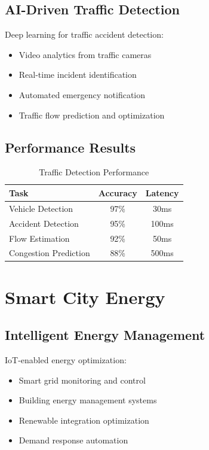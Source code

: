 \documentclass[12pt,a4paper]{article}
\begin{document}
\subsection{AI-Driven Traffic Detection}

Deep learning for traffic accident detection:
\begin{itemize}
    \item Video analytics from traffic cameras
    \item Real-time incident identification
    \item Automated emergency notification
    \item Traffic flow prediction and optimization
\end{itemize}

\subsection{Performance Results}

\begin{table}[H]
\centering
\caption{Traffic Detection Performance}
\begin{tabular}{lcc}
\toprule
\textbf{Task} & \textbf{Accuracy} & \textbf{Latency} \\
\midrule
Vehicle Detection & 97\% & 30ms \\
Accident Detection & 95\% & 100ms \\
Flow Estimation & 92\% & 50ms \\
Congestion Prediction & 88\% & 500ms \\
\bottomrule
\end{tabular}
\end{table}

\section{Smart City Energy}

\subsection{Intelligent Energy Management}

IoT-enabled energy optimization:
\begin{itemize}
    \item Smart grid monitoring and control
    \item Building energy management systems
    \item Renewable integration optimization
    \item Demand response automation
\end{itemize}
\end{document}
